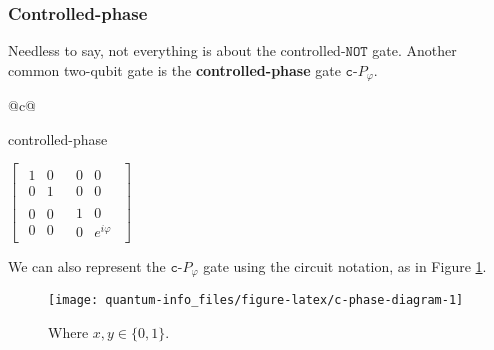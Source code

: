 \documentclass[fleqn]{article}
\renewcommand{\toprule}{}
\renewcommand{\midrule}{}
\renewcommand{\bottomrule}{}
\newenvironment{idea}{\noindent}{\medskip}
\begin{document}
\hypertarget{controlled-phase}{%
\subsubsection{Controlled-phase}\label{controlled-phase}}

Needless to say, not everything is about the controlled-\(\texttt{NOT}\) gate.
Another common two-qubit gate is the \textbf{controlled-phase} gate \(\texttt{c-}P_\varphi\).

\begin{idea}

\begin{longtable}[]{@{}c@{}}
\toprule
\begin{minipage}[b]{(\columnwidth - 0\tabcolsep) * \real{1.00}}\centering
controlled-phase\strut
\end{minipage}\tabularnewline
\midrule
\endhead
\begin{minipage}[t]{(\columnwidth - 0\tabcolsep) * \real{1.00}}\centering
\(\left[\begin{array}{c|c}\begin{matrix}1&0\\0&1\end{matrix}&\begin{matrix}0&0\\0&0\end{matrix}\\\hline\begin{matrix}0&0\\0&0\end{matrix}&\begin{matrix}1&0\\0&e^{i\varphi}\end{matrix}\end{array}\right]\)\strut
\end{minipage}\tabularnewline
\bottomrule
\end{longtable}

\end{idea}

We can also represent the \(\texttt{c-}P_\varphi\) gate using the circuit notation, as in Figure \ref{fig:c-phase-diagram}.



\begin{figure}[H]

{\centering \texttt{[image: quantum-info\_files/figure-latex/c-phase-diagram-1]} 

}

\caption{Where \(x,y\in\{0,1\}\).}\label{fig:c-phase-diagram}
\end{figure}
\end{document}
